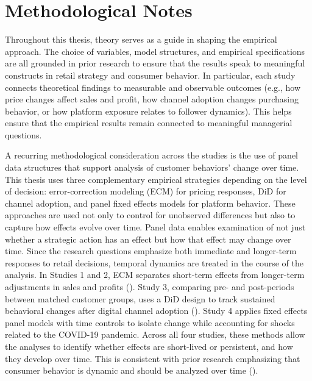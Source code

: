 \section{Methodological Notes}

Throughout this thesis, theory serves as a guide in shaping the empirical approach. The choice of variables, model structures, and empirical specifications are all grounded in prior research to ensure that the results speak to meaningful constructs in retail strategy and consumer behavior. In particular, each study connects theoretical findings to measurable and observable outcomes (e.g., how price changes affect sales and profit, how channel adoption changes purchasing behavior, or how platform exposure relates to follower dynamics). This helps ensure that the empirical results remain connected to meaningful managerial questions.

A recurring methodological consideration across the studies is the use of panel data structures that support analysis of customer behaviors’ change over time. This thesis uses three complementary empirical strategies depending on the level of decision: error-correction modeling (ECM) for pricing responses, DiD for channel adoption, and panel fixed effects models for platform behavior. These approaches are used not only to control for unobserved differences but also to capture how effects evolve over time. Panel data enables examination of not just whether a strategic action has an effect but how that effect may change over time. Since the research questions emphasize both immediate and longer-term responses to retail decisions, temporal dynamics are treated in the course of the analysis. In Studies 1 and 2, ECM separates short-term effects from longer-term adjustments in sales and profits (\cite{Pauwels2007-ky}). Study 3, comparing pre- and post-periods between matched customer groups, uses a DiD design to track sustained behavioral changes after digital channel adoption (\cite{Golder2022-bo}). Study 4 applies fixed effects panel models with time controls to isolate change while accounting for shocks related to the COVID-19 pandemic. Across all four studies, these methods allow the analyses to identify whether effects are short-lived or persistent, and how they develop over time. This is consistent with prior research emphasizing that consumer behavior is dynamic and should be analyzed over time (\cite{Zhang2021-os}).

